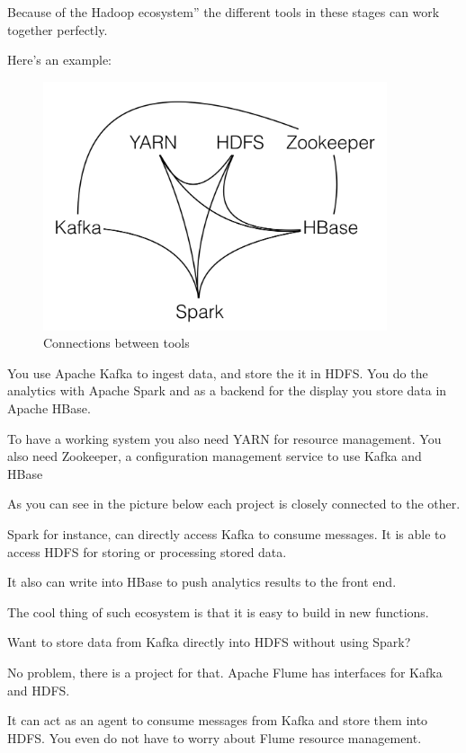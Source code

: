 \documentclass[12pt, numbers=noenddot]{scrreprt} %
\begin{document}
Because of the Hadoop ecosystem” the different tools in these stages can work together perfectly.

Here’s an example:
\begin{figure}[htbp]
  \centering
     \includegraphics[width=0.9\textwidth]{images/Hadoop-Ecosystem-Connections.png}
  \caption{Connections between tools}
  \label{fig:Bild1}
\end{figure}

You use Apache Kafka to ingest data, and store the it in HDFS. You do the analytics with Apache Spark and as a backend for the display you store data in Apache HBase.

To have a working system you also need YARN for resource management. You also need Zookeeper, a configuration management service to use Kafka and HBase

As you can see in the picture below each project is closely connected to the other.

Spark for instance, can directly access Kafka to consume messages. It is able to access HDFS for storing or processing stored data.

It also can write into HBase to push analytics results to the front end.


The cool thing of such ecosystem is that it is easy to build in new functions.

Want to store data from Kafka directly into HDFS without using Spark?

No problem, there is a project for that. Apache Flume has interfaces for Kafka and HDFS.

It can act as an agent to consume messages from Kafka and store them into HDFS. You even do not have to worry about Flume resource management.
\end{document}
